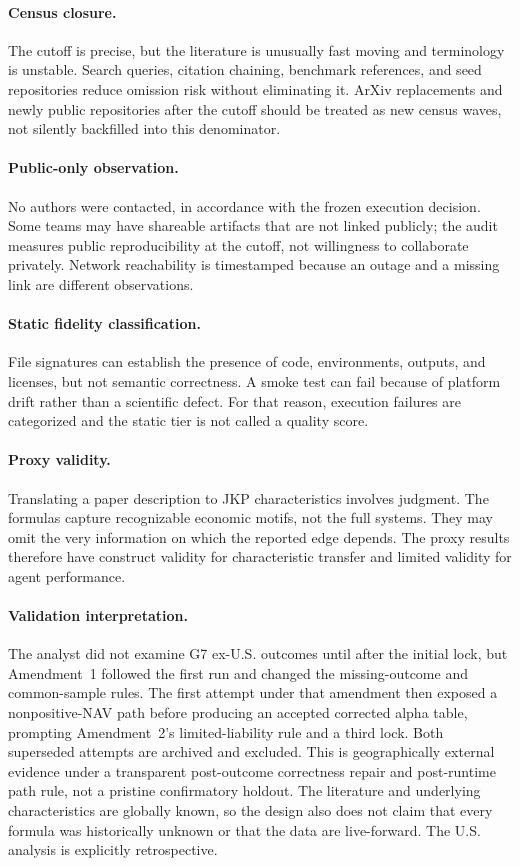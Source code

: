 \documentclass[11pt]{article}
\begin{document}
\paragraph{Census closure.} The cutoff is precise, but the literature is unusually fast moving and terminology is unstable. Search queries, citation chaining, benchmark references, and seed repositories reduce omission risk without eliminating it. ArXiv replacements and newly public repositories after the cutoff should be treated as new census waves, not silently backfilled into this denominator.

\paragraph{Public-only observation.} No authors were contacted, in accordance with the frozen execution decision. Some teams may have shareable artifacts that are not linked publicly; the audit measures public reproducibility at the cutoff, not willingness to collaborate privately. Network reachability is timestamped because an outage and a missing link are different observations.

\paragraph{Static fidelity classification.} File signatures can establish the presence of code, environments, outputs, and licenses, but not semantic correctness. A smoke test can fail because of platform drift rather than a scientific defect. For that reason, execution failures are categorized and the static tier is not called a quality score.

\paragraph{Proxy validity.} Translating a paper description to JKP characteristics involves judgment. The formulas capture recognizable economic motifs, not the full systems. They may omit the very information on which the reported edge depends. The proxy results therefore have construct validity for characteristic transfer and limited validity for agent performance.

\paragraph{Validation interpretation.} The analyst did not examine G7 ex-U.S. outcomes until after the initial lock, but Amendment~1 followed the first run and changed the missing-outcome and common-sample rules. The first attempt under that amendment then exposed a nonpositive-NAV path before producing an accepted corrected alpha table, prompting Amendment~2's limited-liability rule and a third lock. Both superseded attempts are archived and excluded. This is geographically external evidence under a transparent post-outcome correctness repair and post-runtime path rule, not a pristine confirmatory holdout. The literature and underlying characteristics are globally known, so the design also does not claim that every formula was historically unknown or that the data are live-forward. The U.S. analysis is explicitly retrospective.
\end{document}
